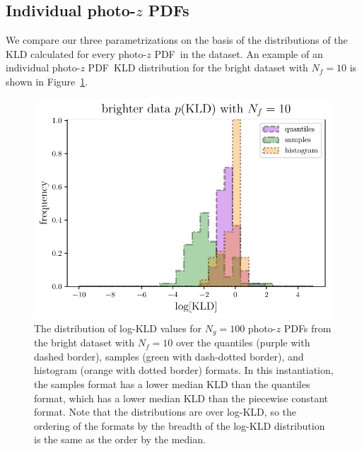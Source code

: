 \documentclass[\docopts]{\docclass}
\newcommand{\pz}{photo-$z$ PDF}
\newcommand{\mgdata}{bright\xspace}
\begin{document}
\subsection{Individual \pz s}
\label{sec:individual_results}

We compare our three parametrizations on the basis of the distributions of the 
KLD calculated for every \pz\ in the dataset.
An example of an individual \pz\ KLD distribution for the \mgdata dataset with 
$N_{f}=10$ is shown in Figure~\ref{fig:individual}.
\begin{figure}
  \begin{center}
    \includegraphics[width=\columnwidth]{figures/individual_kld.pdf}
    \caption{The distribution of log-KLD values for $N_{g}=100$ \pz s from the 
\mgdata dataset with $N_{f}=10$ over the quantiles (purple with dashed border), 
samples (green with dash-dotted border), and histogram (orange with dotted 
border) formats.
    In this instantiation, the samples format has a lower median KLD than the 
quantiles format, which has a lower median KLD than the piecewise constant 
format.
    Note that the distributions are over log-KLD, so the ordering of the 
formats by the breadth of the log-KLD distribution is the same as the order by 
the median.
    \label{fig:individual}}
  \end{center}
\end{figure}
\end{document}
